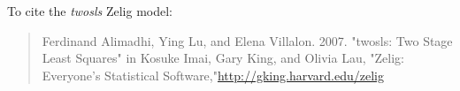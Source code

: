 To cite the \emph{ twosls } Zelig model:
 \begin{verse}
 Ferdinand Alimadhi, Ying Lu, and Elena Villalon. 2007. "twosls: Two Stage Least Squares" in Kosuke Imai, Gary King, and Olivia Lau, "Zelig: Everyone's Statistical Software,"\url{http://gking.harvard.edu/zelig} 
\end{verse}